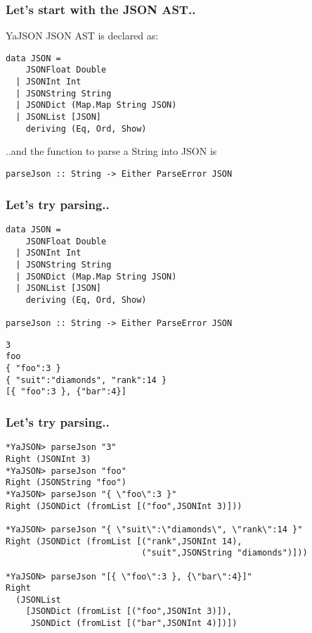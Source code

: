 \documentclass{beamer}
\begin{document}
\begin{frame}[fragile]
\frametitle{Let's start with the JSON AST..}

YaJSON JSON AST is declared as:

\begin{verbatim}
data JSON =
    JSONFloat Double
  | JSONInt Int
  | JSONString String
  | JSONDict (Map.Map String JSON)
  | JSONList [JSON]
    deriving (Eq, Ord, Show)
\end{verbatim}

..and the function to parse a String into JSON is

\begin{verbatim}
parseJson :: String -> Either ParseError JSON
\end{verbatim}
\end{frame}

\begin{frame}[fragile]
\frametitle{Let's try parsing..}

{\small
\begin{verbatim}
data JSON =
    JSONFloat Double
  | JSONInt Int
  | JSONString String
  | JSONDict (Map.Map String JSON)
  | JSONList [JSON]
    deriving (Eq, Ord, Show)

parseJson :: String -> Either ParseError JSON
\end{verbatim}
}

\begin{verbatim}
3
foo
{ "foo":3 }
{ "suit":"diamonds", "rank":14 }
[{ "foo":3 }, {"bar":4}]
\end{verbatim}

\end{frame}


\begin{frame}[fragile]
\frametitle{Let's try parsing..}

{\small
\begin{verbatim}
*YaJSON> parseJson "3"
Right (JSONInt 3)
*YaJSON> parseJson "foo"
Right (JSONString "foo")
*YaJSON> parseJson "{ \"foo\":3 }"
Right (JSONDict (fromList [("foo",JSONInt 3)]))

*YaJSON> parseJson "{ \"suit\":\"diamonds\", \"rank\":14 }"
Right (JSONDict (fromList [("rank",JSONInt 14),
                           ("suit",JSONString "diamonds")]))

*YaJSON> parseJson "[{ \"foo\":3 }, {\"bar\":4}]"
Right
  (JSONList
    [JSONDict (fromList [("foo",JSONInt 3)]),
     JSONDict (fromList [("bar",JSONInt 4)])])
\end{verbatim}
}

\end{frame}
\end{document}
